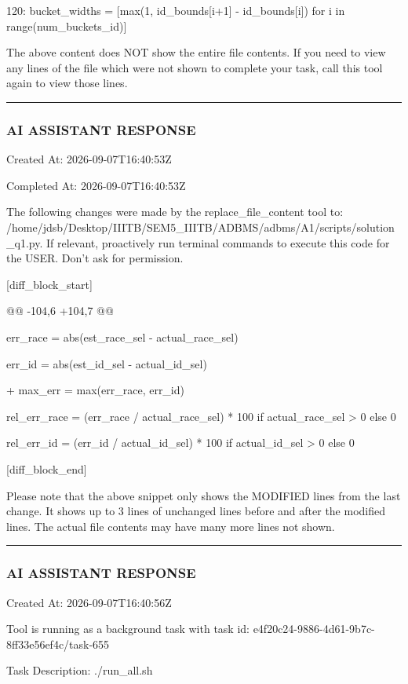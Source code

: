 \documentclass[11pt,a4paper]{article}
\begin{document}
120:         bucket\_widths = [max(1, id\_bounds[i+1] - id\_bounds[i]) for i in range(num\_buckets\_id)]

The above content does NOT show the entire file contents. If you need to view any lines of the file which were not shown to complete your task, call this tool again to view those lines.


\hrule

\subsubsection{AI ASSISTANT RESPONSE}

Created At: 2026-09-07T16:40:53Z

Completed At: 2026-09-07T16:40:53Z

The following changes were made by the replace\_file\_content tool to: /home/jdsb/Desktop/IIITB/SEM5\_IIITB/ADBMS/adbms/A1/scripts/solution\_q1.py. If relevant, proactively run terminal commands to execute this code for the USER. Don't ask for permission.

[diff\_block\_start]

@@ -104,6 +104,7 @@


err\_race = abs(est\_race\_sel - actual\_race\_sel)

err\_id = abs(est\_id\_sel - actual\_id\_sel)

+    max\_err = max(err\_race, err\_id)

rel\_err\_race = (err\_race / actual\_race\_sel) * 100 if actual\_race\_sel > 0 else 0

rel\_err\_id = (err\_id / actual\_id\_sel) * 100 if actual\_id\_sel > 0 else 0


[diff\_block\_end]


Please note that the above snippet only shows the MODIFIED lines from the last change. It shows up to 3 lines of unchanged lines before and after the modified lines. The actual file contents may have many more lines not shown.


\hrule

\subsubsection{AI ASSISTANT RESPONSE}

Created At: 2026-09-07T16:40:56Z

Tool is running as a background task with task id: e4f20c24-9886-4d61-9b7c-8ff33e56ef4c/task-655

Task Description: ./run\_all.sh
\end{document}
